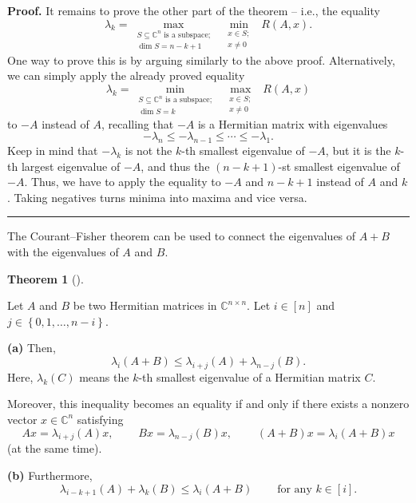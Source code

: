 \documentclass[numbers=enddot,12pt,final,onecolumn,notitlepage]{scrartcl}%
\numberwithin{exer}{subsection}
\theoremstyle{definition}
\newtheorem{theo}{Theorem}[subsection]
\newenvironment{theorem}[1][]
{\begin{theo}[#1]\begin{leftbar}}
{\end{leftbar}\end{theo}}
\newenvironment{proof}[1][Proof]{\noindent\textbf{#1.} }{\ \rule{0.5em}{0.5em}}
\begin{document}
\begin{proof}
It remains to prove the other part of the theorem -- i.e., the equality%
\[
\lambda_{k}=\max\limits_{\substack{S\subseteq\mathbb{C}^{n}\text{ is a
subspace;}\\\dim S=n-k+1}}\ \ \min\limits_{\substack{x\in S;\\x\neq
0}}\ \ R\left(  A,x\right)  .
\]
One way to prove this is by arguing similarly to the above proof.
Alternatively, we can simply apply the already proved equality%
\[
\lambda_{k}=\min\limits_{\substack{S\subseteq\mathbb{C}^{n}\text{ is a
subspace;}\\\dim S=k}}\ \ \max\limits_{\substack{x\in S;\\x\neq0}}\ \ R\left(
A,x\right)
\]
to $-A$ instead of $A$, recalling that $-A$ is a Hermitian matrix with
eigenvalues%
\[
-\lambda_{n}\leq-\lambda_{n-1}\leq\cdots\leq-\lambda_{1}.
\]
Keep in mind that $-\lambda_{k}$ is not the $k$-th smallest eigenvalue of
$-A$, but it is the $k$-th largest eigenvalue of $-A$, and thus the $\left(
n-k+1\right)  $-st smallest eigenvalue of $-A$. Thus, we have to apply the
equality to $-A$ and $n-k+1$ instead of $A$ and $k$. Taking negatives turns
minima into maxima and vice versa.
\end{proof}

The Courant--Fisher theorem can be used to connect the eigenvalues of $A+B$
with the eigenvalues of $A$ and $B$.

\begin{theorem}
[Weyl's inequalities]\label{thm.herm.weyl-ineq}Let $A$ and $B$ be two
Hermitian matrices in $\mathbb{C}^{n\times n}$. Let $i\in\left[  n\right]  $
and $j\in\left\{  0,1,\ldots,n-i\right\}  $. \medskip

\textbf{(a)} Then,%
\[
\lambda_{i}\left(  A+B\right)  \leq\lambda_{i+j}\left(  A\right)
+\lambda_{n-j}\left(  B\right)  .
\]
Here, $\lambda_{k}\left(  C\right)  $ means the $k$-th smallest eigenvalue of
a Hermitian matrix $C$.

Moreover, this inequality becomes an equality if and only if there exists a
nonzero vector $x\in\mathbb{C}^{n}$ satisfying
\[
Ax=\lambda_{i+j}\left(  A\right)  x,\ \ \ \ \ \ \ \ \ \ Bx=\lambda
_{n-j}\left(  B\right)  x,\ \ \ \ \ \ \ \ \ \ \left(  A+B\right)
x=\lambda_{i}\left(  A+B\right)  x
\]
(at the same time). \medskip

\textbf{(b)} Furthermore,%
\[
\lambda_{i-k+1}\left(  A\right)  +\lambda_{k}\left(  B\right)  \leq\lambda
_{i}\left(  A+B\right)  \ \ \ \ \ \ \ \ \ \ \text{for any }k\in\left[
i\right]  .
\]

\end{theorem}
\end{document}

